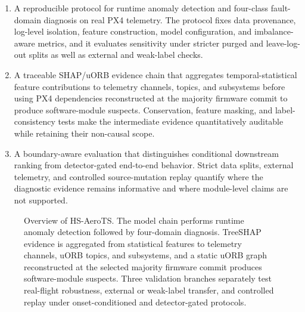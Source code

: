 \begin{enumerate}
    \item A reproducible protocol for runtime anomaly detection and four-class fault-domain diagnosis on real PX4 telemetry. The protocol fixes data provenance, log-level isolation, feature construction, model configuration, and imbalance-aware metrics, and it evaluates sensitivity under stricter purged and leave-log-out splits as well as external and weak-label checks.
    \item A traceable SHAP/uORB evidence chain that aggregates temporal-statistical feature contributions to telemetry channels, topics, and subsystems before using PX4 dependencies reconstructed at the majority firmware commit to produce software-module suspects. Conservation, feature masking, and label-consistency tests make the intermediate evidence quantitatively auditable while retaining their non-causal scope.
    \item A boundary-aware evaluation that distinguishes conditional downstream ranking from detector-gated end-to-end behavior. Strict data splits, external telemetry, and controlled source-mutation replay quantify where the diagnostic evidence remains informative and where module-level claims are not supported.
\end{enumerate}

\begin{figure}[H]
    \centering
    \resizebox{\textwidth}{!}{}
    \caption{Overview of HS-AeroTS. The model chain performs runtime anomaly detection followed by four-domain diagnosis. TreeSHAP evidence is aggregated from statistical features to telemetry channels, uORB topics, and subsystems, and a static uORB graph reconstructed at the selected majority firmware commit produces software-module suspects. Three validation branches separately test real-flight robustness, external or weak-label transfer, and controlled replay under onset-conditioned and detector-gated protocols.}
    \label{fig:framework_overview}
\end{figure}

